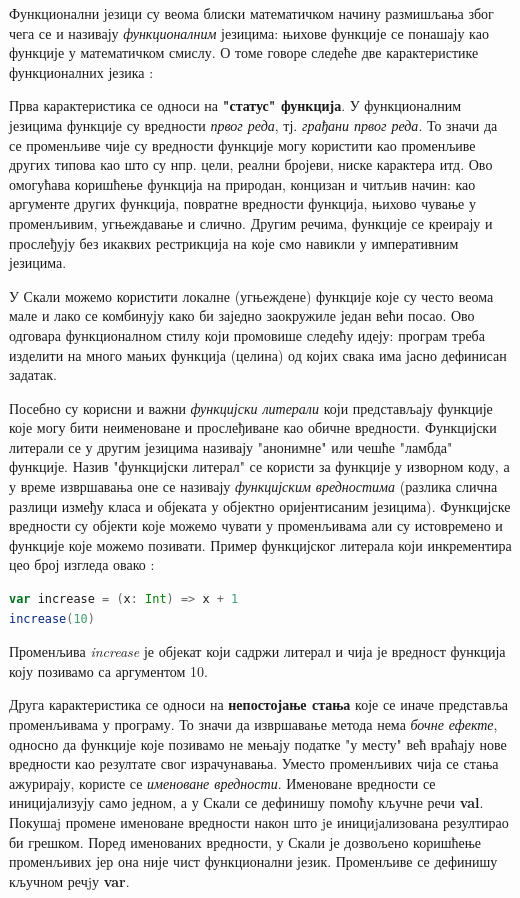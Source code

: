 \documentclass[12pt,oneside]{memoir}
\begin{document}
\par Функционални језици су веома блиски математичком начину размишљања због чега се и називају \textit{функционалним} језицима: њихове функције се понашају као функције у математичком смислу. О томе говоре следеће две карактеристике функционалних језика \cite{progInScala}: 
\par Прва карактеристика се односи на \textbf{"статус" функција}. У функционалним језицима функције су вредности \textit{првог реда}, тј. \textit{грађани првог реда}. То значи да се променљиве чије су вредности функције могу користити као променљиве других типова као што су нпр. цели, реални бројеви, ниске карактера итд. Ово омогућава коришћење функција на природан, концизан и читљив начин: као аргументе других функција, повратне вредности функција, њихово чување у променљивим, угњеждавање и слично. Другим речима, функције се креирају и прослеђују без икаквих рестрикција на које смо навикли у императивним језицима.
\par У Скали можемо користити локалне (угњеждене) функције које су често веома мале и лако се комбинују како би заједно заокружиле један већи посао. Ово одговара функционалном стилу који промовише следећу идеју: програм треба изделити на много мањих функција (целина) од којих свака има јасно дефинисан задатак.
\par Посебно су корисни и важни \textit{функцијски литерали} који представљају функције које могу бити неименоване и прослеђиване као обичне вредности. Функцијски литерали се у другим језицима називају "анонимне" или чешће "ламбда" функције. Назив "функцијски литерал" се користи за функције у изворном коду, а у време извршавања оне се називају \textit{функцијским вредностима} (разлика слична разлици између класа и објеката у објектно оријентисаним језицима). Функцијске вредности су објекти које можемо чувати у променљивама али су истовремено и функције које можемо позивати. Пример функцијског литерала који инкрементира цео број изгледа овако \cite{progInScala}:
\begin{lstlisting}[language=Scala]
var increase = (x: Int) => x + 1
increase(10)
\end{lstlisting}
Променљива \textit{increase} је објекат који садржи литерал и чија је вредност функција коју позивамо са аргументом 10.
\par Друга карактеристика се односи на \textbf{непостојање стања} које се иначе представља променљивама у програму. То значи да извршавање метода нема \textit{бочне ефекте}, односно да функције које позивамо не мењају податке "у месту" већ враћају нове вредности као резултате свог израчунавања. Уместо променљивих чија се стања ажурирају, користе се \textit{именоване вредности}. Именоване вредности се иницијализују само једном, а у Скали се дефинишу помоћу кључне речи \textbf{val}. Покушаj промене именоване вредности након што jе инициjализована резултирао би грешком. Поред именованих вредности, у Скали је дозвољено коришћење променљивих јер она није чист функционални језик. Променљиве се дефинишу кључном речjу \textbf{var}.
\end{document}
